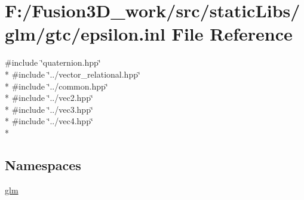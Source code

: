 \hypertarget{epsilon_8inl}{}\section{F\+:/\+Fusion3\+D\+\_\+work/src/static\+Libs/glm/gtc/epsilon.inl File Reference}
\label{epsilon_8inl}
{\ttfamily \#include \char`\"{}quaternion.\+hpp\char`\"{}}\\*
{\ttfamily \#include \char`\"{}../vector\+\_\+relational.\+hpp\char`\"{}}\\*
{\ttfamily \#include \char`\"{}../common.\+hpp\char`\"{}}\\*
{\ttfamily \#include \char`\"{}../vec2.\+hpp\char`\"{}}\\*
{\ttfamily \#include \char`\"{}../vec3.\+hpp\char`\"{}}\\*
{\ttfamily \#include \char`\"{}../vec4.\+hpp\char`\"{}}\\*
\subsection*{Namespaces}
\begin{DoxyCompactItemize}
\item 
 \hyperlink{namespaceglm}{glm}
\end{DoxyCompactItemize}
